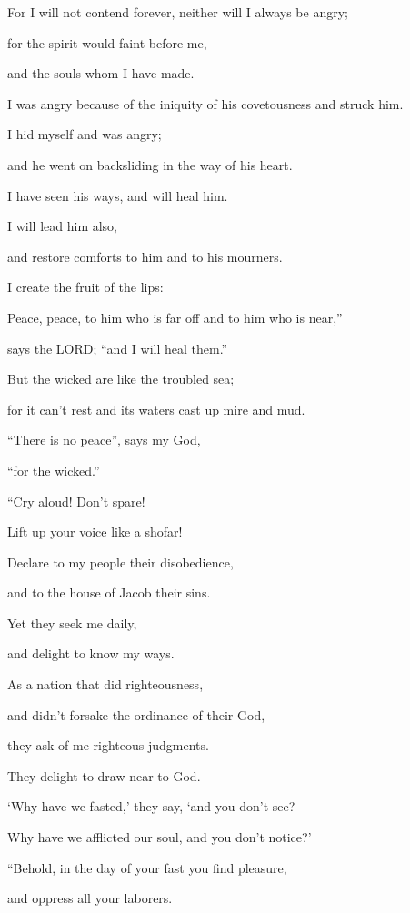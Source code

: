 \myverse{}For I will not contend forever, neither will I always be angry;

for the spirit would faint before me,

and the souls whom I have made.

\myverse{}I was angry because of the iniquity of his covetousness and
struck him.

I hid myself and was angry;

and he went on backsliding in the way of his heart.

\myverse{}I have seen his ways, and will heal him.

I will lead him also,

and restore comforts to him and to his mourners.

\myverse{}I create the fruit of the lips:

Peace, peace, to him who is far off and to him who is near,”

says the LORD; “and I will heal them.”

\myverse{}But the wicked are like the troubled sea;

for it can’t rest and its waters cast up mire and mud.

\myverse{}“There is no peace”, says my God,

“for the wicked.”


\mychapter{} \myverse*{}“Cry aloud! Don’t spare!

\quad\quad Lift up your voice like a shofar!

Declare to my people their disobedience,

and to the house of Jacob their sins.

\myverse{}Yet they seek me daily,

and delight to know my ways.

As a nation that did righteousness,

and didn’t forsake the ordinance of their God,

they ask of me righteous judgments.

They delight to draw near to God.

\myverse{}‘Why have we fasted,’ they say, ‘and you don’t see?

Why have we afflicted our soul, and you don’t notice?’

\vspace{\baselineskip} 
“Behold, in the day of your fast you find pleasure,

and oppress all your laborers.

